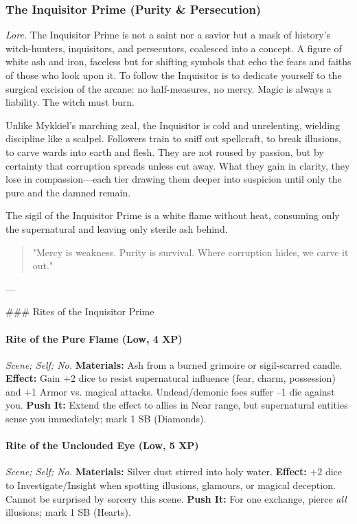
\subsubsection{The Inquisitor Prime (Purity \& Persecution)}
\textit{Lore.} The Inquisitor Prime is not a saint nor a savior but a mask of history’s witch-hunters, inquisitors, and persecutors, coalesced into a concept. A figure of white ash and iron, faceless but for shifting symbols that echo the fears and faiths of those who look upon it. To follow the Inquisitor is to dedicate yourself to the surgical excision of the arcane: no half-measures, no mercy. Magic is always a liability. The witch must burn.  

Unlike Mykkiel’s marching zeal, the Inquisitor is cold and unrelenting, wielding discipline like a scalpel. Followers train to sniff out spellcraft, to break illusions, to carve wards into earth and flesh. They are not roused by passion, but by certainty that corruption spreads unless cut away. What they gain in clarity, they lose in compassion—each tier drawing them deeper into suspicion until only the pure and the damned remain.  

The sigil of the Inquisitor Prime is a white flame without heat, consuming only the supernatural and leaving only sterile ash behind.

\begin{quote}
"Mercy is weakness. Purity is survival. Where corruption hides, we carve it out."
\end{quote}

---

### Rites of the Inquisitor Prime

\paragraph*{Rite of the Pure Flame (Low, 4 XP)} \emph{Scene; Self; No.}  
\textbf{Materials:} Ash from a burned grimoire or sigil-scarred candle.  
\textbf{Effect:} Gain +2 dice to resist supernatural influence (fear, charm, possession) and +1 Armor vs. magical attacks. Undead/demonic foes suffer –1 die against you.  
\textbf{Push It:} Extend the effect to allies in Near range, but supernatural entities sense you immediately; mark 1 SB (Diamonds).  

\paragraph*{Rite of the Unclouded Eye (Low, 5 XP)} \emph{Scene; Self; No.}  
\textbf{Materials:} Silver dust stirred into holy water.  
\textbf{Effect:} +2 dice to Investigate/Insight when spotting illusions, glamours, or magical deception. Cannot be surprised by sorcery this scene.  
\textbf{Push It:} For one exchange, pierce \emph{all} illusions; mark 1 SB (Hearts).  

